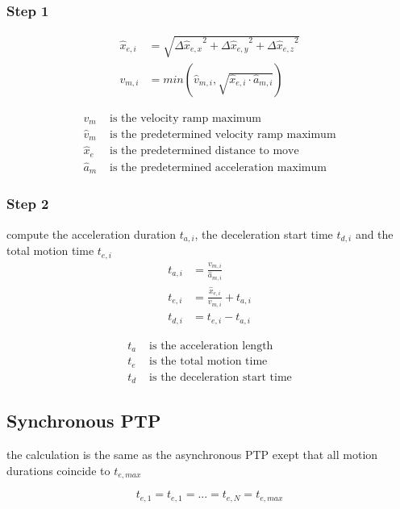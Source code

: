 \documentclass[%
  professionalfonts,%
  xcolor={%
    usenames,%
    dvipsnames,%
    svgnames,%
    table,%
    hyperref%
  }%
]{beamer}
\begin{document}
\subsubsection{Step 1}
\begin{frame}
\begin{align*}
\hat{x}_{e,i} & = \sqrt{{\Delta\hat{x}_{e,x}}^{2} + {\Delta\hat{x}_{e,y}}^{2} + {\Delta\hat{x}_{e,z}}^{2} } \\
v_{m,i } & = min(\hat{v}_{m,i},\sqrt{\hat{x}_{e,i} \cdot \hat{a}_{m,i}})  \label{eq:asynvmi}
\end{align*}

\begin{align*}
v_{m} & \text{ is the velocity ramp maximum} \\
\hat{v}_{m} & \text{ is the predetermined velocity ramp maximum} \\
\hat{x}_{e} & \text{ is the predetermined distance to move} \\
\hat{a}_{m} & \text{ is the predetermined acceleration maximum} 
\end{align*}
\end{frame}

\subsubsection{Step 2}
\begin{frame}
compute the acceleration duration $t_{a,i}$, the deceleration start time $t_{d,i}$ and the total motion time $t_{e,i}$
\begin{align*}
t_{a,i} & = \frac{v_{m,i}}{\hat{a}_{m,i}} \\
t_{e,i} & = \frac{\hat{x}_{e,i}}{v_{m,i}} + t_{a,i} \\
t_{d,i} & = t_{e,i} - t_{a,i}
\end{align*}

\begin{align*}
t_{a} & \text{ is the acceleration length} \\
t_{e} & \text{ is the total motion time} \\
t_{d} & \text{ is the deceleration start time}
\end{align*}
\end{frame}
  
\subsection{Synchronous PTP}
\begin{frame}
the calculation is the same as the asynchronous PTP
exept that all motion durations coincide to $t_{e,max}$

\begin{equation*}
t_{e,1} = t_{e,1} = ... = t_{e,N} = t_{e,max}
\end{equation*}
\end{frame}
\end{document}
